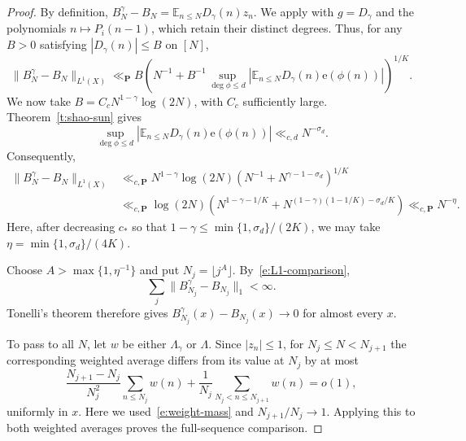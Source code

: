 \documentclass[12pt]{amsart}
\newcommand{\E}{\mathbb E}
\newcommand{\1}{\mathbf 1}
\newcommand{\e}{\mathrm e}
\begin{document}
\begin{proof}
By definition,
$B_N^\gamma-B_N=\E_{n\leq N}D_\gamma(n)z_n$.
We apply \cite[Proposition~1.4]{mousavisolo} with $g=D_\gamma$
and the polynomials $n\mapsto P_i(n-1)$, which retain their
distinct degrees. Thus, for any $B>0$ satisfying $|D_\gamma(n)|\leq B$ on $[N]$,
\[
 \|B_N^\gamma-B_N\|_{L^1(X)}
 \ll_{\mathbf P}
 B\left(
 N^{-1}+B^{-1}
 \sup_{\deg\phi\leq d}
 \left|\E_{n\leq N}D_\gamma(n)\e(\phi(n))\right|
 \right)^{1/K}.
\]
We now take $B=C_cN^{1-\gamma}\log(2N)$, with $C_c$ sufficiently
large.  Theorem~\ref{t:shao-sun} gives
$$\sup_{\deg\phi\leq d}|\E_{n\leq N}D_\gamma(n)\e(\phi(n))|
\ll_{c,d}N^{-\sigma_d}.$$ 
Consequently,
\begin{align}
 \|B_N^\gamma-B_N\|_{L^1(X)}
 &\ll_{c,\mathbf P}
 N^{1-\gamma}\log(2N)
 \left(N^{-1}+N^{\gamma-1-\sigma_d}\right)^{1/K}
 \nonumber\\
 &\ll_{c,\mathbf P}\log(2N)
 \left(
 N^{1-\gamma-1/K}
 +N^{(1-\gamma)(1-1/K)-\sigma_d/K}
 \right)
\ll_{c,\mathbf P}N^{-\eta}.
 \label{e:L1-comparison}
\end{align}
Here, after decreasing $c_*$ so that
$1-\gamma\leq\min\{1,\sigma_d\}/(2K)$, we may take
$\eta=\min\{1,\sigma_d\}/(4K)$.


Choose $A>\max\{1,\eta^{-1}\}$ and put $N_j=\lfloor j^A\rfloor$.
By~\eqref{e:L1-comparison},
$$\sum_j\|B_{N_j}^\gamma-B_{N_j}\|_1<\infty.$$
Tonelli's theorem therefore gives
$B_{N_j}^\gamma(x)-B_{N_j}(x)\to0$ for almost every $x$.

To pass to all $N$, let $w$ be either $\Lambda_\gamma$ or $\Lambda$.
Since $|z_n|\leq1$, for $N_j\leq N<N_{j+1}$ the corresponding
weighted average differs from its value at $N_j$ by at most
\[
 \frac{N_{j+1}-N_j}{N_j^2}\sum_{n\leq N_j}w(n)
 +\frac1{N_j}\sum_{N_j<n\leq N_{j+1}}w(n)
 =o(1),
\]
uniformly in $x$. Here we used~\eqref{e:weight-mass} and
$N_{j+1}/N_j\to1$. Applying this to both weighted averages
proves the full-sequence comparison.
\end{proof}
\end{document}

